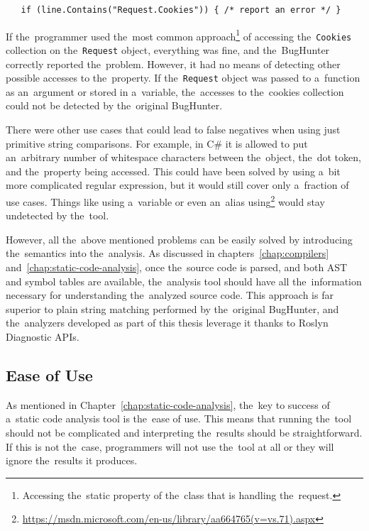 \documentclass[
  digital, %
  table,   %
  lof,     %
  lot,     %
  oneside,
]{fithesis3}
\begin{document}
\begin{verbatim}
   if (line.Contains("Request.Cookies")) { /* report an error */ }
\end{verbatim}


If the~programmer used the~most common approach\footnote{Accessing the~static property of the~class that is handling the~request.} of accessing the~\texttt{Cookies} collection on the~\texttt{Request} object, everything was fine, and the~BugHunter correctly reported the~problem. However, it had no means of detecting other possible accesses to the~property. If the~\texttt{Request} object was passed to a~function as an~argument or stored in a~variable, the~accesses to the~cookies collection could not be detected by the~original BugHunter. 

There were other use cases that could lead to false negatives when using just primitive string comparisons. For example, in C\# it is allowed to put an~arbitrary number of whitespace characters between the~object, the~dot token, and the~property being accessed. This could have been solved by using a~bit more complicated regular expression, but it would still cover only a~fraction of use cases. Things like using a~variable or even an~alias using\footnote{\url{https://msdn.microsoft.com/en-us/library/aa664765(v=vs.71).aspx}} would stay undetected by the~tool. 

However, all the~above mentioned problems can be easily solved by introducing the~semantics into the~analysis. As discussed in chapters~\ref{chap:compilers} and~\ref{chap:static-code-analysis}, once the~source code is parsed, and both AST and symbol tables are available, the~analysis tool should have all the~information necessary for understanding the~analyzed source code. This approach is far superior to plain string matching performed by the~original BugHunter, and the~analyzers developed as part of this thesis leverage it thanks to Roslyn Diagnostic APIs.

\subsection{Ease of Use}
As mentioned in Chapter~\ref{chap:static-code-analysis}, the~key to success of a~static code analysis tool is the~ease of use. This means that running the~tool should not be complicated and interpreting the~results should be straightforward. If this is not the~case, programmers will not use the~tool at all or they will ignore the~results it produces. 
\end{document}
